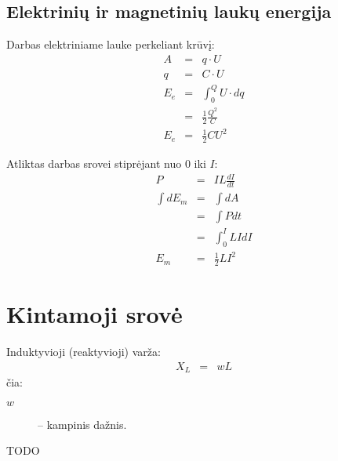 \section{Elektrinių ir magnetinių laukų energija}

Darbas elektriniame lauke perkeliant krūvį:
\begin{align*}
  A &=& q \cdot U \\
  q &=& C \cdot U \\
  E_{e} &=& \int _{0} ^{Q} U \cdot dq \\
  &=& \frac{1}{2} \frac{Q^2}{C} \\
  E_{e} &=& \frac{1}{2} C U^{2}
\end{align*}

Atliktas darbas srovei stiprėjant nuo 0 iki $I$:
\begin{align*}
  P &=& I L \frac{dI}{dt} \\
  \int d E_{m} &=& \int d A \\
  &=& \int P dt \\
  &=& \int _{0} ^{I} L I dI \\
  E_{m} &=& \frac{1}{2} L I^{2}
\end{align*}

\chapter{Kintamoji srovė}

Induktyvioji (reaktyvioji) varža:
\begin{align*}
  X_{L} &=& w L
\end{align*}
čia:
\begin{description}
  \item[$w$] – kampinis dažnis.
\end{description}

\begin{defn}
  TODO
\end{defn}
